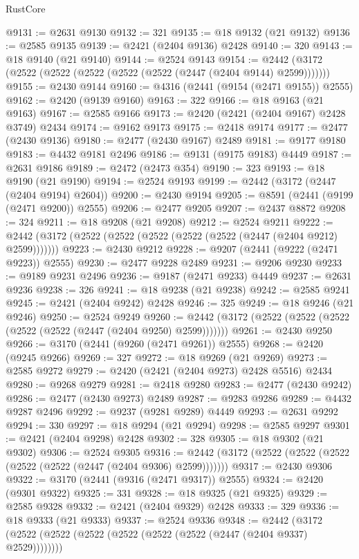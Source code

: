 \begin{lexlean}{RustCore}
\begin{coremodule}
@9131 := @2631 @9130
@9132 := 321
@9135 := @18 @9132 (@21 @9132)
@9136 := @2585 @9135
@9139 := @2421 (@2404 @9136) @2428
@9140 := 320
@9143 := @18 @9140 (@21 @9140)
@9144 := @2524 @9143
@9154 := @2442 (@3172 (@2522 (@2522 (@2522 (@2522 (@2522 (@2447 (@2404 @9144) @2599)))))))
@9155 := @2430 @9144
@9160 := @4316 (@2441 (@9154 (@2471 @9155)) @2555)
@9162 := @2420 (@9139 @9160)
@9163 := 322
@9166 := @18 @9163 (@21 @9163)
@9167 := @2585 @9166
@9173 := @2420 (@2421 (@2404 @9167) @2428 @3749) @2434
@9174 := @9162 @9173
@9175 := @2418 @9174
@9177 := @2477 (@2430 @9136)
@9180 := @2477 (@2430 @9167) @2489
@9181 := @9177 @9180
@9183 := @4432 @9181 @2496
@9186 := @9131 (@9175 @9183) @4449
@9187 := @2631 @9186
@9189 := @2472 (@2473 @354)
@9190 := 323
@9193 := @18 @9190 (@21 @9190)
@9194 := @2524 @9193
@9199 := @2442 (@3172 (@2447 (@2404 @9194) @2604))
@9200 := @2430 @9194
@9205 := @8591 (@2441 (@9199 (@2471 @9200)) @2555)
@9206 := @2477 @9205
@9207 := @2437 @8872
@9208 := 324
@9211 := @18 @9208 (@21 @9208)
@9212 := @2524 @9211
@9222 := @2442 (@3172 (@2522 (@2522 (@2522 (@2522 (@2522 (@2447 (@2404 @9212) @2599)))))))
@9223 := @2430 @9212
@9228 := @9207 (@2441 (@9222 (@2471 @9223)) @2555)
@9230 := @2477 @9228 @2489
@9231 := @9206 @9230
@9233 := @9189 @9231 @2496
@9236 := @9187 (@2471 @9233) @4449
@9237 := @2631 @9236
@9238 := 326
@9241 := @18 @9238 (@21 @9238)
@9242 := @2585 @9241
@9245 := @2421 (@2404 @9242) @2428
@9246 := 325
@9249 := @18 @9246 (@21 @9246)
@9250 := @2524 @9249
@9260 := @2442 (@3172 (@2522 (@2522 (@2522 (@2522 (@2522 (@2447 (@2404 @9250) @2599)))))))
@9261 := @2430 @9250
@9266 := @3170 (@2441 (@9260 (@2471 @9261)) @2555)
@9268 := @2420 (@9245 @9266)
@9269 := 327
@9272 := @18 @9269 (@21 @9269)
@9273 := @2585 @9272
@9279 := @2420 (@2421 (@2404 @9273) @2428 @5516) @2434
@9280 := @9268 @9279
@9281 := @2418 @9280
@9283 := @2477 (@2430 @9242)
@9286 := @2477 (@2430 @9273) @2489
@9287 := @9283 @9286
@9289 := @4432 @9287 @2496
@9292 := @9237 (@9281 @9289) @4449
@9293 := @2631 @9292
@9294 := 330
@9297 := @18 @9294 (@21 @9294)
@9298 := @2585 @9297
@9301 := @2421 (@2404 @9298) @2428
@9302 := 328
@9305 := @18 @9302 (@21 @9302)
@9306 := @2524 @9305
@9316 := @2442 (@3172 (@2522 (@2522 (@2522 (@2522 (@2522 (@2447 (@2404 @9306) @2599)))))))
@9317 := @2430 @9306
@9322 := @3170 (@2441 (@9316 (@2471 @9317)) @2555)
@9324 := @2420 (@9301 @9322)
@9325 := 331
@9328 := @18 @9325 (@21 @9325)
@9329 := @2585 @9328
@9332 := @2421 (@2404 @9329) @2428
@9333 := 329
@9336 := @18 @9333 (@21 @9333)
@9337 := @2524 @9336
@9348 := @2442 (@3172 (@2522 (@2522 (@2522 (@2522 (@2522 (@2522 (@2447 (@2404 @9337) @2529))))))))

\end{coremodule}
\end{lexlean}
